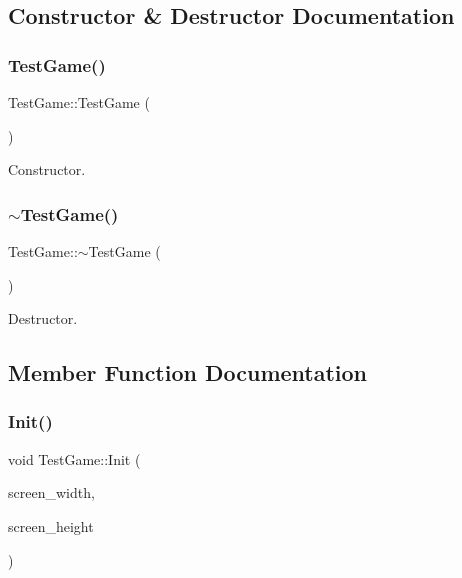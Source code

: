 \subsection{Constructor \& Destructor Documentation}
\mbox{\label{class_test_game_a59adf28e5c02386f31f444e1f85aa80d}} 
\subsubsection{\texorpdfstring{TestGame()}{TestGame()}}
{\footnotesize\ttfamily Test\+Game\+::\+Test\+Game (\begin{DoxyParamCaption}{ }\end{DoxyParamCaption})}



Constructor. 

\mbox{\label{class_test_game_ac0b3267478f7d6ccea98338d3f1dee1a}} 
\subsubsection{\texorpdfstring{$\sim$TestGame()}{~TestGame()}}
{\footnotesize\ttfamily Test\+Game\+::$\sim$\+Test\+Game (\begin{DoxyParamCaption}{ }\end{DoxyParamCaption})}



Destructor. 



\subsection{Member Function Documentation}
\mbox{\label{class_test_game_aabd73405594a1ee0f0d312fe4e1eb237}} 
\subsubsection{\texorpdfstring{Init()}{Init()}\hspace{0.1cm}{\footnotesize\ttfamily [1/2]}}
{\footnotesize\ttfamily void Test\+Game\+::\+Init (\begin{DoxyParamCaption}\item[{G\+Luint}]{screen\+\_\+width,  }\item[{G\+Luint}]{screen\+\_\+height }\end{DoxyParamCaption})}



